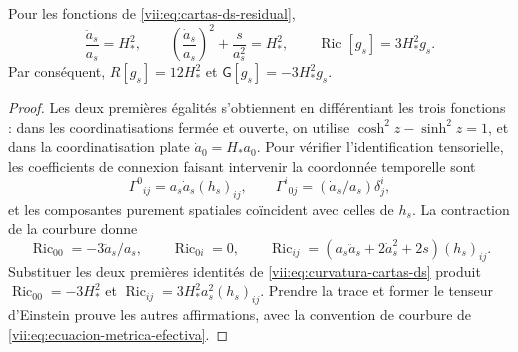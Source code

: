 \begin{lemma}
\label{vii:lem:curvatura-cartas-ds}
Pour les fonctions de \eqref{vii:eq:cartas-ds-residual},
\begin{equation}
 \frac{\ddot a_s}{a_s}=H_*^2,\qquad
 \left(\frac{\dot a_s}{a_s}\right)^2+\frac{s}{a_s^2}=H_*^2,
 \qquad
 \operatorname{Ric}[g_s]=3H_*^2g_s.
 \label{vii:eq:curvatura-cartas-ds}
\end{equation}
Par conséquent, \(R[g_s]=12H_*^2\) et
\(\mathsf G[g_s]=-3H_*^2g_s\).
\end{lemma}
\begin{proof}
Les deux premières égalités s'obtiennent en différentiant les trois fonctions : dans les coordinatisations fermée et ouverte, on utilise \(\cosh^2z-\sinh^2z=1\), et dans la coordinatisation plate \(\dot a_0=H_*a_0\). Pour vérifier l'identification tensorielle, les coefficients de connexion faisant intervenir la coordonnée temporelle sont
\[
 \Gamma^0{}_{ij}=a_s\dot a_s(h_s)_{ij},\qquad
 \Gamma^i{}_{0j}=(\dot a_s/a_s)\delta^i_j,
\]
et les composantes purement spatiales coïncident avec celles de \(h_s\). La contraction de la courbure donne
\[
 \operatorname{Ric}_{00}=-3\ddot a_s/a_s,\qquad
 \operatorname{Ric}_{0i}=0,\qquad
 \operatorname{Ric}_{ij}
  =(a_s\ddot a_s+2\dot a_s^2+2s)(h_s)_{ij}.
\]
Substituer les deux premières identités de
\eqref{vii:eq:curvatura-cartas-ds} produit
\(\operatorname{Ric}_{00}=-3H_*^2\) et
\(\operatorname{Ric}_{ij}=3H_*^2a_s^2(h_s)_{ij}\).
Prendre la trace et former le tenseur d'Einstein prouve les autres
affirmations, avec la convention de courbure de
\eqref{vii:eq:ecuacion-metrica-efectiva}.
\end{proof}

